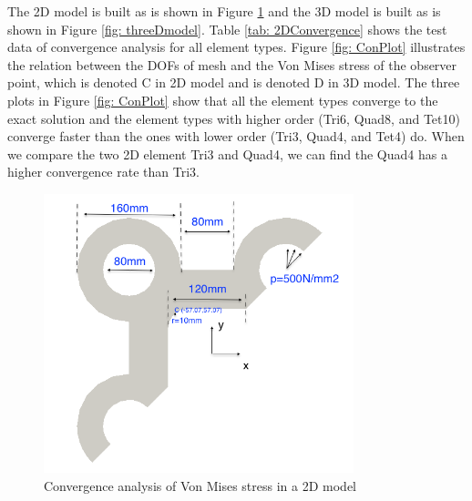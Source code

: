 The 2D model is built as is shown in Figure \ref{fig: twoDmodel} and the 3D model is built as is shown in Figure \ref{fig: threeDmodel}. Table \ref{tab: 2DConvergence} shows the test data of convergence analysis for all element types. Figure \ref{fig: ConPlot} illustrates the relation between the DOFs of mesh and the Von Mises stress of the observer point, which is denoted C in 2D model and is denoted D in 3D model. The three plots in Figure \ref{fig: ConPlot} show that all the element types converge to the exact solution and the element types with higher order (Tri6, Quad8, and Tet10) converge faster than the ones with lower order (Tri3, Quad4, and Tet4) do. When we compare the two 2D element Tri3 and Quad4, we can find the Quad4 has a higher convergence rate than Tri3. 

\begin{figure}[htbp]
	\begin{center}	
		\includegraphics[width=9cm,clip]{twoDmodel.png} 			
		\caption{Convergence analysis of Von Mises stress in a 2D model} \label{fig: twoDmodel}
	\end{center}
\end{figure}

